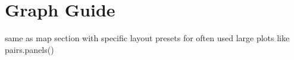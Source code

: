 \section{Graph Guide}
same as map section with specific layout presets for often used large plots like pairs.panels()
